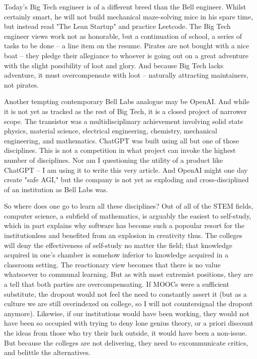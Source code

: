\documentclass[12pt]{article}
\begin{document}
Today's Big Tech engineer is of a different breed than the Bell engineer. Whilst certainly smart, he will not build mechanical maze-solving mice in his spare time, but instead read "The Lean Startup" and practice Leetcode. The Big Tech engineer views work not as honorable, but a continuation of school, a series of tasks to be done – a line item on the resume. Pirates are not bought with a nice boat – they pledge their allegiance to whoever is going out on a great adventure with the slight possibility of loot and glory. And because Big Tech lacks adventure, it must overcompensate with loot – naturally attracting maintainers, not pirates.

Another tempting contemporary Bell Labs analogue may be OpenAI. And while it is not yet as tracked as the rest of Big Tech, it is a closed project of narrower scope. The transistor was a multidisciplinary achievement involving solid state physics, material science, electrical engineering, chemistry, mechanical engineering, and mathematics. ChatGPT was built using all but one of those disciplines. This is not a competition in what project can invoke the highest number of disciplines. Nor am I questioning the utility of a product like ChatGPT – I am using it to write this very article. And OpenAI might one day create "safe AGI," but the company is not yet as exploding and cross-disciplined of an institution as Bell Labs was.

So where does one go to learn all these disciplines? Out of all of the STEM fields, computer science, a subfield of mathematics, is arguably the easiest to self-study, which in part explains why software has become such a popoular resort for the institutionless and benefited from an explosion in creativity thus. The colleges will deny the effectiveness of self-study no matter the field; that knowledge acquired in one's chamber is somehow inferior to knowledge acquired in a classroom setting. The reactionary view becomes that there is no value whatsoever to communal learning. But as with most extremist positions, they are a tell that both parties are overcompensating. If MOOCs were a sufficient substitute, the dropout would not feel the need to constantly assert it (but as a culture we are still overindexed on college, so I will not countersignal the dropout anymore). Likewise, if our institutions would have been working, they would not have been so occupied with trying to deny lone genius theory, or a priori discount the ideas from those who try their luck outside, it would have been a non-issue. But because the colleges are not delivering, they need to excommunicate critics, and belittle the alternatives.
\end{document}
